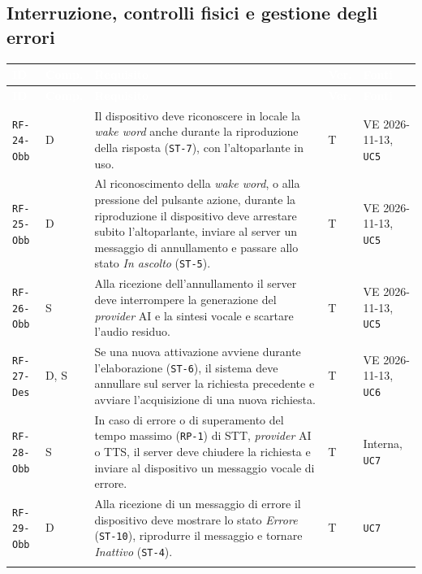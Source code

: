 \documentclass[12pt,a4paper]{article}
\newcommand{\thc}[1]{\textcolor{white}{\textbf{#1}}}
\newcommand{\rl}{\\ \arrayrulecolor{bfline}\hline}
\begin{document}
\subsection{Interruzione, controlli fisici e gestione degli errori}
\begin{longtable}{>{\raggedright\arraybackslash}p{}>{\centering\arraybackslash}p{}>{\raggedright\arraybackslash}p{}>{\centering\arraybackslash}p{}>{\raggedright\arraybackslash}p{}}
\rowcolor{bfblue}\thc{ID} & \thc{Comp.} & \thc{Requisito} & \thc{Ver.} & \thc{Fonti} \\ \endfirsthead
\rowcolor{bfblue}\thc{ID} & \thc{Comp.} & \thc{Requisito} & \thc{Ver.} & \thc{Fonti} \\ \endhead
\texttt{RF-24-Obb} & D & Il dispositivo deve riconoscere in locale la \emph{wake word} anche durante la riproduzione della risposta (\texttt{ST-7}), con l'altoparlante in uso. & T & VE 2026-11-13, \texttt{UC5} \rl

\texttt{RF-25-Obb} & D & Al riconoscimento della \emph{wake word}, o alla pressione del pulsante azione, durante la riproduzione il dispositivo deve arrestare subito l'altoparlante, inviare al server un messaggio di annullamento e passare allo stato \emph{In ascolto} (\texttt{ST-5}). & T & VE 2026-11-13, \texttt{UC5} \rl

\texttt{RF-26-Obb} & S & Alla ricezione dell'annullamento il server deve interrompere la generazione del \emph{provider} AI e la sintesi vocale e scartare l'audio residuo. & T & VE 2026-11-13, \texttt{UC5} \rl

\texttt{RF-27-Des} & D, S & Se una nuova attivazione avviene durante l'elaborazione (\texttt{ST-6}), il sistema deve annullare sul server la richiesta precedente e avviare l'acquisizione di una nuova richiesta. & T & VE 2026-11-13, \texttt{UC6} \rl

\texttt{RF-28-Obb} & S & In caso di errore o di superamento del tempo massimo (\texttt{RP-1}) di STT, \emph{provider} AI o TTS, il server deve chiudere la richiesta e inviare al dispositivo un messaggio vocale di errore. & T & Interna, \texttt{UC7} \rl

\texttt{RF-29-Obb} & D & Alla ricezione di un messaggio di errore il dispositivo deve mostrare lo stato \emph{Errore} (\texttt{ST-10}), riprodurre il messaggio e tornare \emph{Inattivo} (\texttt{ST-4}). & T & \texttt{UC7} \rl


\end{longtable}
\end{document}
